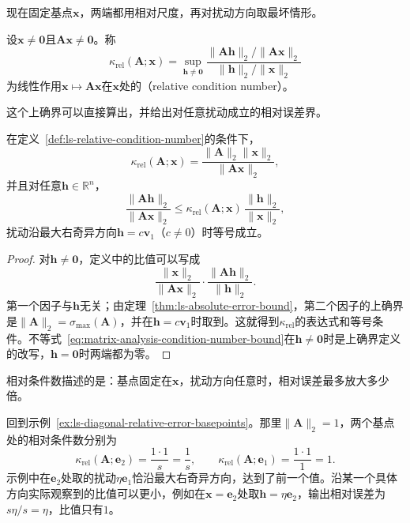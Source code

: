 现在固定基点$\bm x$，两端都用相对尺度，再对扰动方向取最坏情形。
\begin{definition}[线性作用的相对条件数]
\label{def:ls-relative-condition-number}
设$\bm x\neq\bm0$且$\bm A\bm x\neq\bm0$。称
\begin{equation}
 \kappa_{\mathrm{rel}}(\bm A;\bm x)
 =\sup_{\bm h\neq\bm0}
 \frac{\lVert\bm A\bm h\rVert_2/\lVert\bm A\bm x\rVert_2}
      {\lVert\bm h\rVert_2/\lVert\bm x\rVert_2}
 \label{eq:ls-relative-condition-number}
\end{equation}
为线性作用$\bm x\mapsto\bm A\bm x$在$\bm x$处的（relative condition number）。
\end{definition}
这个上确界可以直接算出，并给出对任意扰动成立的相对误差界。
\begin{theorem}[相对条件数与相对误差界]
\label{thm:ls-relative-condition-number}
在定义~\ref{def:ls-relative-condition-number}的条件下，
\begin{equation}
 \kappa_{\mathrm{rel}}(\bm A;\bm x)=\frac{\lVert\bm A\rVert_2\lVert\bm x\rVert_2}{\lVert\bm A\bm x\rVert_2},
 \label{eq:ls-relative-condition-number-formula}
\end{equation}
并且对任意$\bm h\in\mathbb R^n$，
\begin{equation}
 \frac{\lVert\bm A\bm h\rVert_2}{\lVert\bm A\bm x\rVert_2}
 \leq\kappa_{\mathrm{rel}}(\bm A;\bm x)\,\frac{\lVert\bm h\rVert_2}{\lVert\bm x\rVert_2},
 \label{eq:matrix-analysis-condition-number-bound}
\end{equation}
扰动沿最大右奇异方向$\bm h=c\bm v_1$（$c\neq0$）时等号成立。
\end{theorem}
\begin{proof}
对$\bm h\neq\bm0$，定义中的比值可以写成
\[
 \frac{\lVert\bm x\rVert_2}{\lVert\bm A\bm x\rVert_2}\cdot
 \frac{\lVert\bm A\bm h\rVert_2}{\lVert\bm h\rVert_2}.
\]
第一个因子与$\bm h$无关；由定理~\ref{thm:ls-absolute-error-bound}，第二个因子的上确界是$\lVert\bm A\rVert_2=\sigma_{\max}(\bm A)$，并在$\bm h=c\bm v_1$时取到。这就得到$\kappa_{\mathrm{rel}}$的表达式和等号条件。不等式~\eqref{eq:matrix-analysis-condition-number-bound}在$\bm h\neq\bm0$时是上确界定义的改写，$\bm h=\bm0$时两端都为零。
\end{proof}
相对条件数描述的是：基点固定在$\bm x$，扰动方向任意时，相对误差最多放大多少倍。

回到示例~\ref{ex:ls-diagonal-relative-error-basepoints}。那里$\lVert\bm A\rVert_2=1$，两个基点处的相对条件数分别为
\[
 \kappa_{\mathrm{rel}}(\bm A;\bm e_2)=\frac{1\cdot1}{s}=\frac1s,\qquad
 \kappa_{\mathrm{rel}}(\bm A;\bm e_1)=\frac{1\cdot1}{1}=1 .
\]
示例中在$\bm e_2$处取的扰动$\eta\bm e_1$恰沿最大右奇异方向，达到了前一个值。沿某一个具体方向实际观察到的比值可以更小，例如在$\bm x=\bm e_2$处取$\bm h=\eta\bm e_2$，输出相对误差为$s\eta/s=\eta$，比值只有$1$。

